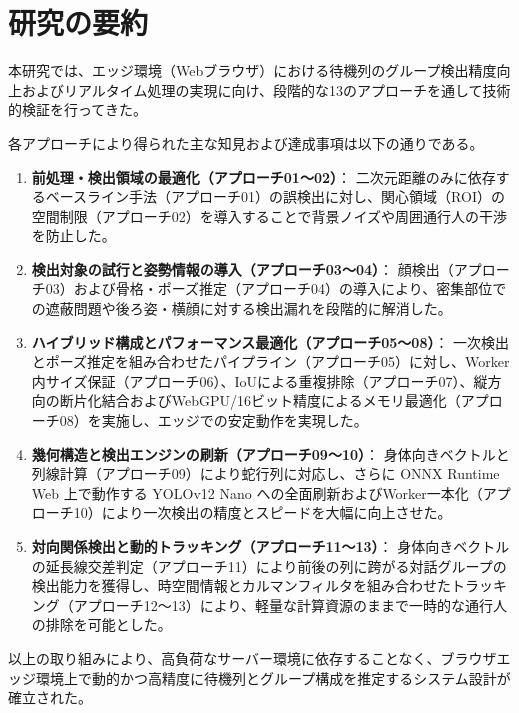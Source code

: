 \section{研究の要約}

本研究では、エッジ環境（Webブラウザ）における待機列のグループ検出精度向上およびリアルタイム処理の実現に向け、段階的な13のアプローチを通して技術的検証を行ってきた。

各アプローチにより得られた主な知見および達成事項は以下の通りである。

\begin{enumerate}
    \item \textbf{前処理・検出領域の最適化（アプローチ01〜02）}：
    二次元距離のみに依存するベースライン手法（アプローチ01）の誤検出に対し、関心領域（ROI）の空間制限（アプローチ02）を導入することで背景ノイズや周囲通行人の干渉を防止した。
    \item \textbf{検出対象の試行と姿勢情報の導入（アプローチ03〜04）}：
    顔検出（アプローチ03）および骨格・ポーズ推定（アプローチ04）の導入により、密集部位での遮蔽問題や後ろ姿・横顔に対する検出漏れを段階的に解消した。
    \item \textbf{ハイブリッド構成とパフォーマンス最適化（アプローチ05〜08）}：
    一次検出とポーズ推定を組み合わせたパイプライン（アプローチ05）に対し、Worker内サイズ保証（アプローチ06）、IoUによる重複排除（アプローチ07）、縦方向の断片化結合およびWebGPU/16ビット精度によるメモリ最適化（アプローチ08）を実施し、エッジでの安定動作を実現した。
    \item \textbf{幾何構造と検出エンジンの刷新（アプローチ09〜10）}：
    身体向きベクトルと列線計算（アプローチ09）により蛇行列に対応し、さらに ONNX Runtime Web 上で動作する YOLOv12 Nano への全面刷新およびWorker一本化（アプローチ10）により一次検出の精度とスピードを大幅に向上させた。
    \item \textbf{対向関係検出と動的トラッキング（アプローチ11〜13）}：
    身体向きベクトルの延長線交差判定（アプローチ11）により前後の列に跨がる対話グループの検出能力を獲得し、時空間情報とカルマンフィルタを組み合わせたトラッキング（アプローチ12〜13）により、軽量な計算資源のままで一時的な通行人の排除を可能とした。
\end{enumerate}

以上の取り組みにより、高負荷なサーバー環境に依存することなく、ブラウザエッジ環境上で動的かつ高精度に待機列とグループ構成を推定するシステム設計が確立された。
